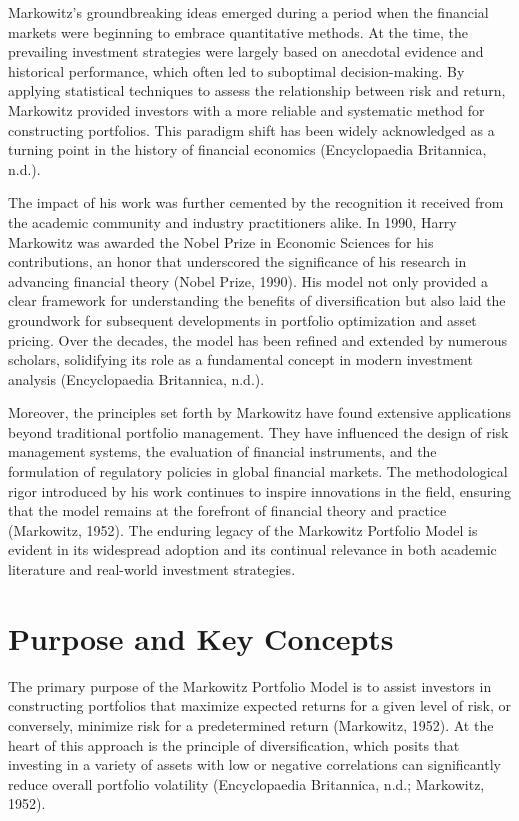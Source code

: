 \documentclass[11pt]{article}
\begin{document}
Markowitz’s groundbreaking ideas emerged during a period when the financial markets were beginning to embrace quantitative methods. At the time, the prevailing investment strategies were largely based on anecdotal evidence and historical performance, which often led to suboptimal decision-making. By applying statistical techniques to assess the relationship between risk and return, Markowitz provided investors with a more reliable and systematic method for constructing portfolios. This paradigm shift has been widely acknowledged as a turning point in the history of financial economics (Encyclopaedia Britannica, n.d.).

The impact of his work was further cemented by the recognition it received from the academic community and industry practitioners alike. In 1990, Harry Markowitz was awarded the Nobel Prize in Economic Sciences for his contributions, an honor that underscored the significance of his research in advancing financial theory (Nobel Prize, 1990). His model not only provided a clear framework for understanding the benefits of diversification but also laid the groundwork for subsequent developments in portfolio optimization and asset pricing. Over the decades, the model has been refined and extended by numerous scholars, solidifying its role as a fundamental concept in modern investment analysis (Encyclopaedia Britannica, n.d.).

Moreover, the principles set forth by Markowitz have found extensive applications beyond traditional portfolio management. They have influenced the design of risk management systems, the evaluation of financial instruments, and the formulation of regulatory policies in global financial markets. The methodological rigor introduced by his work continues to inspire innovations in the field, ensuring that the model remains at the forefront of financial theory and practice (Markowitz, 1952). The enduring legacy of the Markowitz Portfolio Model is evident in its widespread adoption and its continual relevance in both academic literature and real-world investment strategies.

\newpage

\section{Purpose and Key Concepts}
The primary purpose of the Markowitz Portfolio Model is to assist investors in constructing portfolios that maximize expected returns for a given level of risk, or conversely, minimize risk for a predetermined return (Markowitz, 1952). At the heart of this approach is the principle of diversification, which posits that investing in a variety of assets with low or negative correlations can significantly reduce overall portfolio volatility (Encyclopaedia Britannica, n.d.; Markowitz, 1952).
\end{document}
